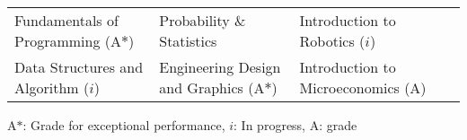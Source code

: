 
\begin{tabular*}{\textwidth}{l l l l}
  Fundamentals of Programming (A$*$) & Probability \& Statistics  & Introduction to Robotics ($i$) \\
  Data Structures and Algorithm ($i$) & Engineering Design and Graphics (A$*$)& Introduction to Microeconomics (A) \\
\end{tabular*}
{\footnotesize
    {A$*$: Grade for exceptional performance, $i$: In progress, A: grade}
}
